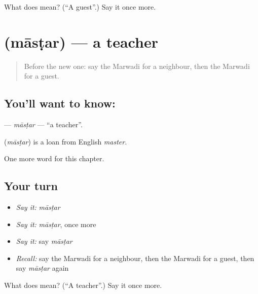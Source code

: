 \begin{tcolorbox}[breakable,colback=teal!4,colframe=teal!35!black,title={Before you move on}]
What does  mean? (\textquotedblleft{}A guest\textquotedblright{}.) Say it once more.
\end{tcolorbox}
\section[\texorpdfstring{\mw{मास्टर} (māsṭar)}{मास्टर (māsṭar)}]{ (māsṭar) — a teacher}

\label{lesson:MW-C50-mastar}



\begin{quote}
Before the new one: say the Marwadi for a neighbour, then the Marwadi for a guest.
\end{quote}

\subsection*{You'll want to know: }
\textbf{} — \emph{māsṭar} — \textquotedblleft{}a teacher\textquotedblright{}.

\begin{cousinweb}
\textbf{} (\emph{māsṭar}) is a loan from English \emph{master}.
\end{cousinweb}

\begin{grammarlens}[title={What you've built}]
One more word for this chapter.
\end{grammarlens}

\subsection*{Your turn}
\begin{itemize}
\raggedright
  \item \emph{Say it:} \emph{māsṭar}
  \item \emph{Say it:} \emph{māsṭar}, once more
  \item \emph{Say it:} say \emph{māsṭar}
  \item \emph{Recall:} say the Marwadi for a neighbour, then the Marwadi for a guest, then say \emph{māsṭar} again
\end{itemize}

\begin{tcolorbox}[breakable,colback=teal!4,colframe=teal!35!black,title={Before you move on}]
What does  mean? (\textquotedblleft{}A teacher\textquotedblright{}.) Say it once more.
\end{tcolorbox}
